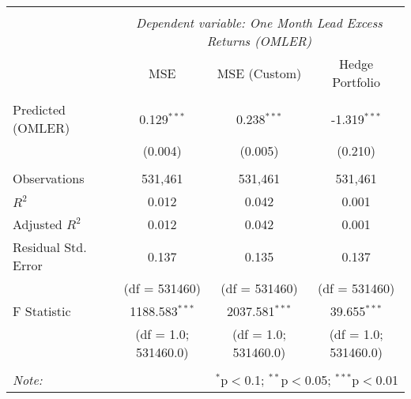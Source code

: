 \begin{table}[!htbp] \centering
\begin{tabular}{@{\extracolsep{5pt}}lccc}
\\[-1.8ex]\hline
\hline \\[-1.8ex]
& \multicolumn{3}{c}{\textit{Dependent variable: One Month Lead Excess Returns (OMLER)}} \
\cr \cline{3-4}
\\[-1.8ex] &  MSE & MSE (Custom) & Hedge Portfolio \\
\hline \\[-1.8ex]
 Predicted (OMLER)  & 0.129$^{***}$ & 0.238$^{***}$ & -1.319$^{***}$ \\
  & (0.004) & (0.005) & (0.210) \\
\hline \\[-1.8ex]
 Observations & 531,461 & 531,461 & 531,461 \\
 $R^2$ & 0.012 & 0.042 & 0.001 \\
 Adjusted $R^2$ & 0.012 & 0.042 & 0.001 \\
 Residual Std. Error & 0.137 & 0.135 & 0.137 \\
 &(df = 531460)&(df = 531460)&(df = 531460)\\
 F Statistic & 1188.583$^{***}$ & 2037.581$^{***}$ & 39.655$^{***}$ \\
 &(df = 1.0; 531460.0)&(df = 1.0; 531460.0)&(df = 1.0; 531460.0)\\ 
\hline
\hline \\[-1.8ex]
\textit{Note:} & \multicolumn{3}{r}{$^{*}$p$<$0.1; $^{**}$p$<$0.05; $^{***}$p$<$0.01} \\
\end{tabular}
\end{table}

